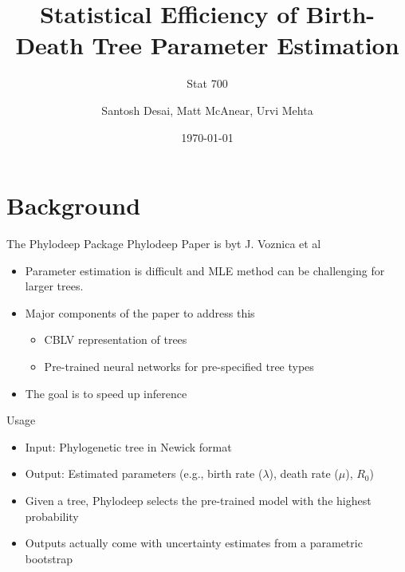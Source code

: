 \documentclass{beamer}
\author{Santosh Desai, Matt McAnear, Urvi Mehta}
\title{Statistical Efficiency of Birth-Death Tree Parameter Estimation}
\subtitle{Stat 700}
\institute{Department of Statistics, University of Michigan}
\date{\today}
\begin{document}
\begin{frame}
\maketitle
\end{frame}


\section{Background}

\begin{frame}{The Phylodeep Package}
    Phylodeep Paper is byt J. Voznica et al \cite{voznica_deep_2022}
    \begin{itemize}
        \item Parameter estimation is difficult and MLE method can be challenging for larger trees.
        \item Major components of the paper to address this
        \begin{itemize}
            \item CBLV representation of trees
            \item Pre-trained neural networks for pre-specified tree types
        \end{itemize}
        \item The goal is to speed up inference
    \end{itemize}
\end{frame}


\begin{frame}{Usage}
    \begin{itemize}
        \item Input: Phylogenetic tree in Newick format
        \item Output: Estimated parameters (e.g., birth rate ($\lambda$), death rate ($\mu$), $R_0$)
        \item Given a tree, Phylodeep selects the pre-trained model with the highest probability
        \item Outputs actually come with uncertainty estimates from a parametric bootstrap
    \end{itemize}
\end{frame}
\end{document}
